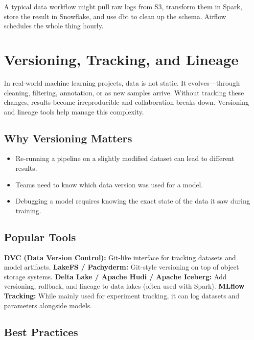 \documentclass[12pt,openany, draft]{book}
\begin{document}
\begin{examplebox}
A typical data workflow might pull raw logs from S3, transform them in Spark, store the result in Snowflake, and use dbt to clean up the schema. Airflow schedules the whole thing hourly.
\end{examplebox}



\section{Versioning, Tracking, and Lineage}

In real-world machine learning projects, data is not static. It evolves—through cleaning, filtering, annotation, or as new samples arrive. Without tracking these changes, results become irreproducible and collaboration breaks down. Versioning and lineage tools help manage this complexity.

\subsection*{Why Versioning Matters}

\begin{itemize}
    \item Re-running a pipeline on a slightly modified dataset can lead to different results.
    \item Teams need to know which data version was used for a model.
    \item Debugging a model requires knowing the exact state of the data it saw during training.
\end{itemize}

\subsection*{Popular Tools}

\textbf{DVC (Data Version Control):} Git-like interface for tracking datasets and model artifacts.\newline
\textbf{LakeFS / Pachyderm:} Git-style versioning on top of object storage systems.\newline
\textbf{Delta Lake / Apache Hudi / Apache Iceberg:} Add versioning, rollback, and lineage to data lakes (often used with Spark).\newline
\textbf{MLflow Tracking:} While mainly used for experiment tracking, it can log datasets and parameters alongside models.

\subsection*{Best Practices}
\end{document}
